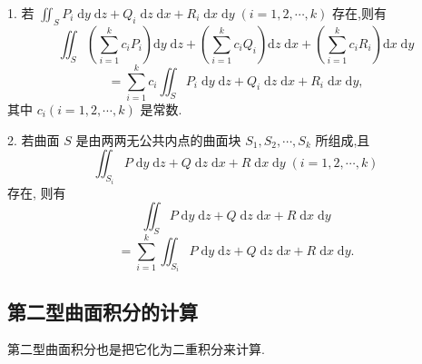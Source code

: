 1. 若 \({\iint }_{S}{P}_{i}\mathrm{\;d}y\mathrm{\;d}z + {Q}_{i}\mathrm{\;d}z\mathrm{\;d}x + {R}_{i}\mathrm{\;d}x\mathrm{\;d}y\;\left( {i = 1,2,\cdots ,k}\right)\) 存在,则有
\[
{\iint }_{S}\left( {\mathop{\sum }\limits_{{i = 1}}^{k}{c}_{i}{P}_{i}}\right) \mathrm{d}y\mathrm{\;d}z + \left( {\mathop{\sum }\limits_{{i = 1}}^{k}{c}_{i}{Q}_{i}}\right) \mathrm{d}z\mathrm{\;d}x + \left( {\mathop{\sum }\limits_{{i = 1}}^{k}{c}_{i}{R}_{i}}\right) \mathrm{d}x\mathrm{\;d}y
\]
\[
= \mathop{\sum }\limits_{{i = 1}}^{k}{c}_{i}{\iint }_{S}{P}_{i}\mathrm{\;d}y\mathrm{\;d}z + {Q}_{i}\mathrm{\;d}z\mathrm{\;d}x + {R}_{i}\mathrm{\;d}x\mathrm{\;d}y,
\]
其中 \({c}_{i}\left( {i = 1,2,\cdots ,k}\right)\) 是常数.

2. 若曲面 \(S\) 是由两两无公共内点的曲面块 \({S}_{1},{S}_{2},\cdots ,{S}_{k}\) 所组成,且
\[
{\iint }_{{S}_{i}}P\mathrm{\;d}y\mathrm{\;d}z + Q\mathrm{\;d}z\mathrm{\;d}x + R\mathrm{\;d}x\mathrm{\;d}y\;\left( {i = 1,2,\cdots ,k}\right)
\]
存在, 则有
\[
{\iint }_{S}P\mathrm{\;d}y\mathrm{\;d}z + Q\mathrm{\;d}z\mathrm{\;d}x + R\mathrm{\;d}x\mathrm{\;d}y
\]
\[
= \mathop{\sum }\limits_{{i = 1}}^{k}{\iint }_{{S}_{i}}P\mathrm{\;d}y\mathrm{\;d}z + Q\mathrm{\;d}z\mathrm{\;d}x + R\mathrm{\;d}x\mathrm{\;d}y.
\]
\subsection{第二型曲面积分的计算}

第二型曲面积分也是把它化为二重积分来计算.

